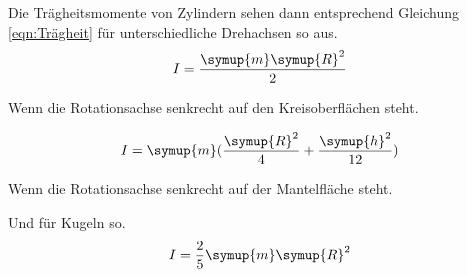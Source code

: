 Die Trägheitsmomente von Zylindern sehen dann entsprechend Gleichung \ref{eqn:Trägheit} für unterschiedliche
Drehachsen so aus.
\begin{equation}
    I=\frac{\symup{m}\symup{R}^2}{2} 
    \label{eqn:Trägheit_Zyl_1} 
\end{equation}
    \begin{center} 
    Wenn die Rotationsachse senkrecht auf den Kreisoberflächen steht.
    \end{center}
\begin{equation}
    I=\symup{m} (\frac{\symup{R}^2}{4}+\frac{\symup{h}^2}{12}) 
    \label{eqn:Trägheit_Zyl_2}  
\end{equation}
\begin{center}   
    Wenn die Rotationsachse senkrecht auf der Mantelfläche steht.
\end{center}

Und für Kugeln so.
\begin{equation}
    I=\frac{2}{5}\symup{m}\symup{R}^2
    \label{eqn:Trägheit_Kugel}
\end{equation}
\cite{sample}
